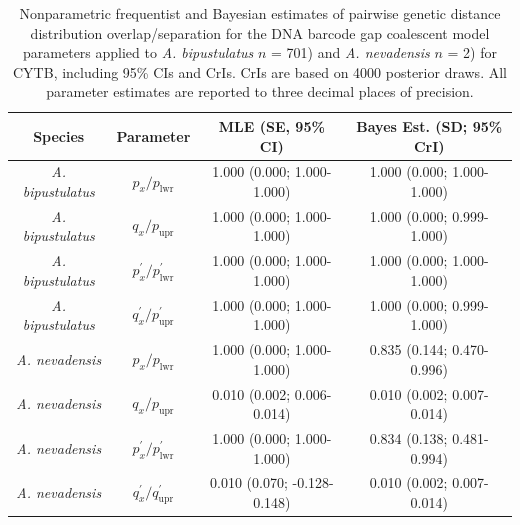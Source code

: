 \documentclass[12pt]{article}
\begin{document}
\begin{landscape}
\begin{table}[H]

\centering

\caption{Nonparametric frequentist and Bayesian estimates of pairwise genetic distance distribution overlap/separation for the DNA barcode gap coalescent model parameters applied to \textit{A. bipustulatus} $n$ = 701) and \textit{A. nevadensis} $n$ = 2) for CYTB, including 95\%  CIs and CrIs. CrIs are based on 4000 posterior draws. All parameter estimates are reported to three decimal places of precision.}

\begin{tabular}{cccc} \hline

\textbf{Species} & \textbf{Parameter} & \textbf{MLE (SE, 95\% CI)} & \textbf{Bayes Est. (SD; 95\% CrI)} \\  \hline
\textit{A. bipustulatus} & $p_x/p_\mathrm{lwr}$ & 1.000 (0.000; 1.000-1.000) & 1.000 (0.000; 1.000-1.000) \\
\textit{A. bipustulatus} & $q_x/p_\mathrm{upr}$ & 1.000 (0.000; 1.000-1.000) & 1.000 (0.000; 0.999-1.000) \\
\textit{A. bipustulatus} & $p^{'}_x/p^{'}_\mathrm{lwr}$ & 1.000 (0.000; 1.000-1.000) & 1.000 (0.000; 1.000-1.000)  \\
\textit{A. bipustulatus} & $q^{'}_x/p^{'}_\mathrm{upr}$ & 1.000 (0.000; 1.000-1.000) & 1.000 (0.000; 0.999-1.000) \\


\textit{A. nevadensis} & $p_x/p_\mathrm{lwr}$ & 1.000 (0.000; 1.000-1.000) & 0.835 (0.144; 0.470-0.996) \\
\textit{A. nevadensis} & $q_x/p_\mathrm{upr}$ & 0.010 (0.002; 0.006-0.014) & 0.010 (0.002; 0.007-0.014) \\
\textit{A. nevadensis} &  $p^{'}_x/p^{'}_\mathrm{lwr}$ & 1.000 (0.000; 1.000-1.000) & 0.834 (0.138; 0.481-0.994) \\
\textit{A. nevadensis} &  $q^{'}_x/q^{'}_\mathrm{upr}$ & 0.010 (0.070; -0.128-0.148) & 0.010 (0.002; 0.007-0.014) \\


\hline


\end{tabular}

\end{table}
\end{landscape}

\newpage
\end{document}
